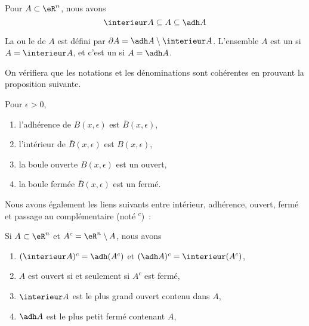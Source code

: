 \begin{proposition}
Pour $A \subset \eR^n$, nous avons
\begin{equation*}
	\interieur A \subseteq A  \subseteq \adh A
\end{equation*}
\end{proposition}

\begin{definition}
  La  ou le  de $A$ est défini par $\partial A = \adh A \setminus \interieur A$. L'ensemble $A$ est un  si $A = \interieur A$, et c'est un  si $A = \adh A$.
\end{definition}

On vérifiera que les notations et les dénominations sont cohérentes en
prouvant la proposition suivante.
\begin{proposition}Pour $\epsilon > 0$,
  \begin{enumerate}
  \item l'adhérence de $B(x,\epsilon)$ est $\bar B(x,\epsilon)$,
  \item l'intérieur de $\bar B(x,\epsilon)$ est $B(x,\epsilon)$,
  \item la boule ouverte $B(x,\epsilon)$ est un ouvert,
  \item la boule fermée $\bar B(x,\epsilon)$ est un fermé.
  \end{enumerate}
\end{proposition}

Nous avons également les liens suivants entre intérieur, adhérence,
ouvert, fermé et passage au complémentaire (noté ${}^c$)~:
\begin{proposition}
Si $A \subset \eR^n$ et $A^c = \eR^n\setminus A$, nous
  avons
  \begin{enumerate}
  \item $(\interieur A)^c = \adh (A^c)$ et $(\adh A)^c = \interieur
    (A^c)$,
  \item $A$ est ouvert si et seulement si $A^c$ est fermé,
  \item $\interieur A$ est le plus grand ouvert contenu dans $A$,
  \item $\adh A$ est le plus petit fermé contenant $A$,
  \end{enumerate}
\end{proposition}

